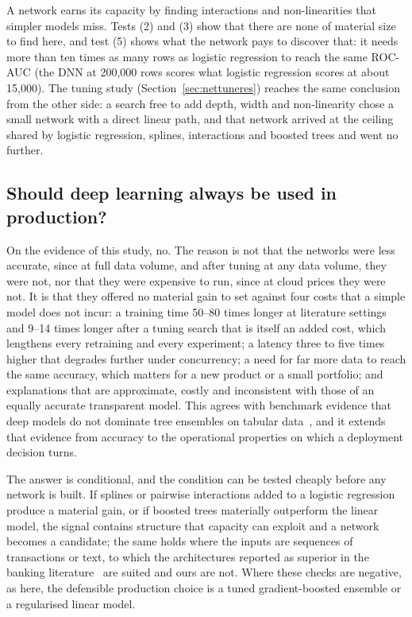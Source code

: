 \documentclass[conference]{IEEEtran}
\begin{document}
A network earns its capacity by finding interactions and non-linearities that simpler models miss. Tests (2) and (3) show that there are none of material size to find here, and test (5) shows what the network pays to discover that: it needs more than ten times as many rows as logistic regression to reach the same ROC-AUC (the DNN at 200,000 rows scores what logistic regression scores at about 15,000). The tuning study (Section~\ref{sec:nettuneres}) reaches the same conclusion from the other side: a search free to add depth, width and non-linearity chose a small network with a direct linear path, and that network arrived at the ceiling shared by logistic regression, splines, interactions and boosted trees and went no further.

\subsection{Should deep learning always be used in production?}
On the evidence of this study, no. The reason is not that the networks were less accurate, since at full data volume, and after tuning at any data volume, they were not, nor that they were expensive to run, since at cloud prices they were not. It is that they offered no material gain to set against four costs that a simple model does not incur: a training time 50--80 times longer at literature settings and 9--14 times longer after a tuning search that is itself an added cost, which lengthens every retraining and every experiment; a latency three to five times higher that degrades further under concurrency; a need for far more data to reach the same accuracy, which matters for a new product or a small portfolio; and explanations that are approximate, costly and inconsistent with those of an equally accurate transparent model. This agrees with benchmark evidence that deep models do not dominate tree ensembles on tabular data~\cite{grinsztajn2022tree,shwartzziv2022tabular,borisov2024deep}, and it extends that evidence from accuracy to the operational properties on which a deployment decision turns.

The answer is conditional, and the condition can be tested cheaply before any network is built. If splines or pairwise interactions added to a logistic regression produce a material gain, or if boosted trees materially outperform the linear model, the signal contains structure that capacity can exploit and a network becomes a candidate; the same holds where the inputs are sequences of transactions or text, to which the architectures reported as superior in the banking literature~\cite{haddadi2022iranian,latheef2021lstm} are suited and ours are not. Where these checks are negative, as here, the defensible production choice is a tuned gradient-boosted ensemble or a regularised linear model.
\end{document}
